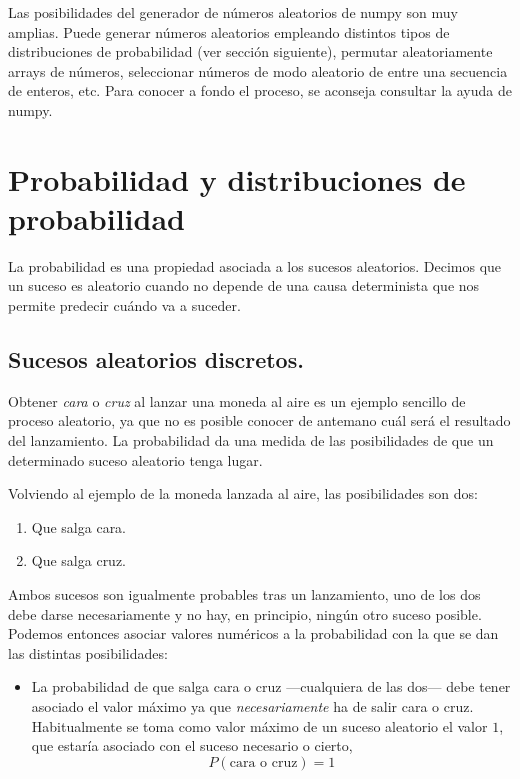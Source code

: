 \begin{paracol}{2}
Las posibilidades del generador de números aleatorios de numpy son muy amplias. Puede generar números aleatorios empleando distintos tipos de distribuciones de probabilidad (ver sección siguiente), permutar aleatoriamente arrays de números, seleccionar números de modo aleatorio de entre una secuencia de enteros, etc. Para conocer a fondo el proceso, se aconseja consultar la ayuda de numpy.

\section{Probabilidad y distribuciones de probabilidad}
La probabilidad es una propiedad asociada a los sucesos aleatorios. Decimos que un suceso es aleatorio cuando no depende de una causa determinista que nos permite predecir cuándo va a suceder. 

\subsection{Sucesos aleatorios discretos.}
Obtener \emph{cara} o \emph{cruz} al lanzar una moneda al aire es un ejemplo sencillo de proceso aleatorio, ya que no es posible conocer de antemano cuál será el resultado del lanzamiento. La probabilidad da una medida de las posibilidades de que un determinado suceso aleatorio tenga lugar.

Volviendo al ejemplo de la moneda  lanzada al aire, las posibilidades son dos:
\begin{enumerate}
\item Que salga cara.
\item Que salga cruz.
\end{enumerate}
Ambos sucesos son igualmente probables tras un lanzamiento, uno de los dos debe darse necesariamente y no hay, en principio, ningún otro suceso posible. Podemos entonces asociar valores numéricos a la probabilidad con la que se dan las distintas posibilidades:
\begin{itemize}
\item La probabilidad de que salga cara o cruz ---cualquiera de las dos--- debe tener asociado el valor máximo ya que \emph{necesariamente} ha de salir cara o cruz.  Habitualmente se toma como valor máximo de un suceso aleatorio el valor $1$, que estaría asociado con el suceso necesario o cierto,
\begin{equation*}
P(\text{cara o cruz}) = 1
\end{equation*}


\end{itemize}
\end{paracol}
